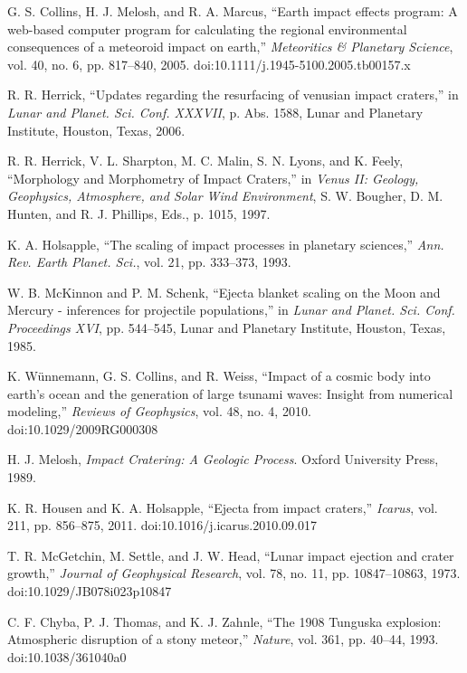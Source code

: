 \documentclass[conference]{IEEEtran}
\begin{document}
\begin{thebibliography}{00}

	G. S. Collins, H. J. Melosh, and R. A. Marcus, ``Earth impact effects program: A web-based computer program for calculating the regional environmental consequences of a meteoroid impact on earth,'' \textit{Meteoritics \& Planetary Science}, vol. 40, no. 6, pp. 817--840, 2005. doi:10.1111/j.1945-5100.2005.tb00157.x

	R. R. Herrick, ``Updates regarding the resurfacing of venusian impact craters,'' in \textit{Lunar and Planet. Sci. Conf. XXXVII}, p. Abs. 1588, Lunar and Planetary Institute, Houston, Texas, 2006.

	R. R. Herrick, V. L. Sharpton, M. C. Malin, S. N. Lyons, and K. Feely, ``Morphology and Morphometry of Impact Craters,'' in \textit{Venus II: Geology, Geophysics, Atmosphere, and Solar Wind Environment}, S. W. Bougher, D. M. Hunten, and R. J. Phillips, Eds., p. 1015, 1997.

	K. A. Holsapple, ``The scaling of impact processes in planetary sciences,'' \textit{Ann. Rev. Earth Planet. Sci.}, vol. 21, pp. 333--373, 1993.

	W. B. McKinnon and P. M. Schenk, ``Ejecta blanket scaling on the Moon and Mercury - inferences for projectile populations,'' in \textit{Lunar and Planet. Sci. Conf. Proceedings XVI}, pp. 544--545, Lunar and Planetary Institute, Houston, Texas, 1985.

	K. Wünnemann, G. S. Collins, and R. Weiss, ``Impact of a cosmic body into earth’s ocean and the generation of large tsunami waves: Insight from numerical modeling,'' \textit{Reviews of Geophysics}, vol. 48, no. 4, 2010. doi:10.1029/2009RG000308

	H. J. Melosh, \textit{Impact Cratering: A Geologic Process}. Oxford University Press, 1989.

	K. R. Housen and K. A. Holsapple, ``Ejecta from impact craters,'' \textit{Icarus}, vol. 211, pp. 856--875, 2011. doi:10.1016/j.icarus.2010.09.017

	T. R. McGetchin, M. Settle, and J. W. Head, ``Lunar impact ejection and crater growth,'' \textit{Journal of Geophysical Research}, vol. 78, no. 11, pp. 10847--10863, 1973. doi:10.1029/JB078i023p10847

	C. F. Chyba, P. J. Thomas, and K. J. Zahnle, ``The 1908 Tunguska explosion: Atmospheric disruption of a stony meteor,'' \textit{Nature}, vol. 361, pp. 40--44, 1993. doi:10.1038/361040a0


\end{thebibliography}
\end{document}
